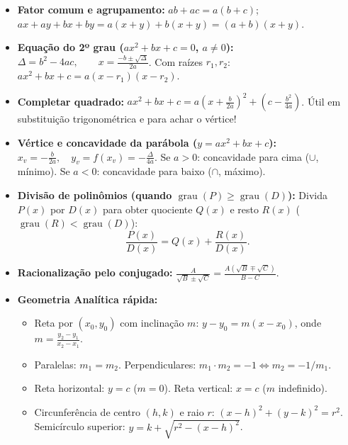 \documentclass[10pt,a4paper]{article}
\begin{document}
\begin{itemize}
    \item \textbf{Fator comum e agrupamento:} $ab + ac = a(b+c)$; \quad $ax + ay + bx + by = a(x+y) + b(x+y) = (a+b)(x+y)$.
    \item \textbf{Equação do 2º grau ($ax^2 + bx + c = 0$, $a \neq 0$):}
          $\displaystyle \Delta = b^2 - 4ac, \qquad x = \frac{-b \pm \sqrt{\Delta}}{2a}$.
          Com raízes $r_1, r_2$: $\displaystyle ax^2 + bx + c = a(x-r_1)(x-r_2)$.
    \item \textbf{Completar quadrado:}
          $\displaystyle ax^2 + bx + c = a\!\left(x + \frac{b}{2a}\right)^2 + \left(c - \frac{b^2}{4a}\right)$.
          Útil em substituição trigonométrica e para achar o vértice!
    \item \textbf{Vértice e concavidade da parábola ($y = ax^2 + bx + c$):}
          $\displaystyle x_v = -\frac{b}{2a}, \quad y_v = f(x_v) = -\frac{\Delta}{4a}$.
          Se $a > 0$: concavidade para cima ($\cup$, mínimo). Se $a < 0$: concavidade para baixo ($\cap$, máximo).
    \item \textbf{Divisão de polinômios (quando $\operatorname{grau}(P) \ge \operatorname{grau}(D)$):}
          Divida $P(x)$ por $D(x)$ para obter quociente $Q(x)$ e resto $R(x)$ ($\operatorname{grau}(R) < \operatorname{grau}(D)$):
          \[
              \frac{P(x)}{D(x)} = Q(x) + \frac{R(x)}{D(x)}.
          \]
    \item \textbf{Racionalização pelo conjugado:}
          $\displaystyle \frac{A}{\sqrt{B} \pm \sqrt{C}} = \frac{A(\sqrt{B} \mp \sqrt{C})}{B - C}$.
    \item \textbf{Geometria Analítica rápida:}
          \begin{itemize}
              \item Reta por $(x_0, y_0)$ com inclinação $m$: $\displaystyle y - y_0 = m(x - x_0)$, onde $\displaystyle m = \frac{y_2 - y_1}{x_2 - x_1}$.
              \item Paralelas: $m_1 = m_2$. Perpendiculares: $m_1 \cdot m_2 = -1 \iff m_2 = -1/m_1$.
              \item Reta horizontal: $y = c$ ($m=0$). Reta vertical: $x = c$ ($m$ indefinido).
              \item Circunferência de centro $(h,k)$ e raio $r$: $(x-h)^2 + (y-k)^2 = r^2$. Semicírculo superior: $y = k + \sqrt{r^2 - (x-h)^2}$.
          \end{itemize}
\end{itemize}
\end{document}
